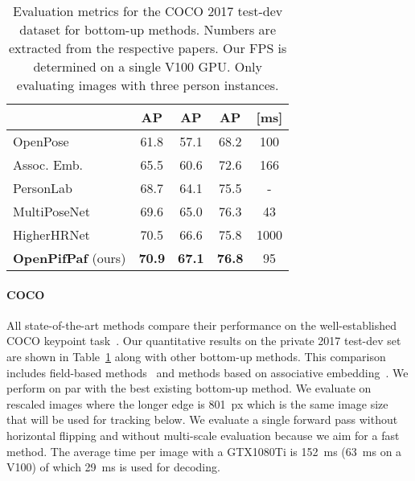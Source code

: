 \documentclass[journal]{IEEEtran}
\newcommand{\hl}[1]{#1}
\begin{document}
\begin{table}[t]
  \centering
  \caption{
    Evaluation metrics for the COCO 2017 test-dev dataset for
    bottom-up methods. Numbers are extracted from the respective papers.
    Our FPS is determined on a single V100 GPU.
    Only evaluating images with three person instances.
  }
  \label{tab:high-res}
  \begin{tabular}{|l|c c c c|}
    \hline
                            & \textbf{AP} & AP & AP &  [ms] \\
    \hline\hline
    OpenPose~\cite{cao2017realtime}                 & 61.8 & 57.1 & 68.2 & 100 \\
    Assoc. Emb.~\cite{newell2017associative}  & 65.5 & 60.6 & 72.6 & 166 \\
PersonLab~\cite{papandreou2018personlab}     & 68.7 & 64.1 & 75.5 & - \\
    MultiPoseNet~\cite{kocabas2018multiposenet}  & 69.6 & 65.0 & 76.3 & 43 \\
    HigherHRNet~\cite{cheng2020higherhrnet}           & 70.5 & 66.6 & 75.8 & 1000 \\
    \textbf{OpenPifPaf} (ours)  & \hl{\textbf{70.9}} & \hl{\textbf{67.1}} & \hl{\textbf{76.8}} & 95 \\
    \hline
  \end{tabular}
\end{table}


\paragraph{COCO}
All state-of-the-art methods compare their performance on the well-established
COCO keypoint task~\cite{lin2014microsoft}.
Our quantitative results on the private 2017 test-dev set are shown
in Table~\ref{tab:high-res} along with other bottom-up methods.
This comparison includes field-based
methods~\cite{cao2017realtime,papandreou2018personlab,kreiss2019pifpaf}
and methods based on associative
embedding~\cite{newell2017associative,cheng2020higherhrnet}.
We perform on par with the best existing
bottom-up method.
We evaluate on rescaled images where the longer edge is 801~px which is the
same image size that will be used for tracking below. We evaluate a single
forward pass without horizontal flipping and without multi-scale evaluation because
we aim for a fast method.
The average time per image with a GTX1080Ti is 152~ms (63~ms on a V100) of which 29~ms
is used for decoding.
\end{document}
